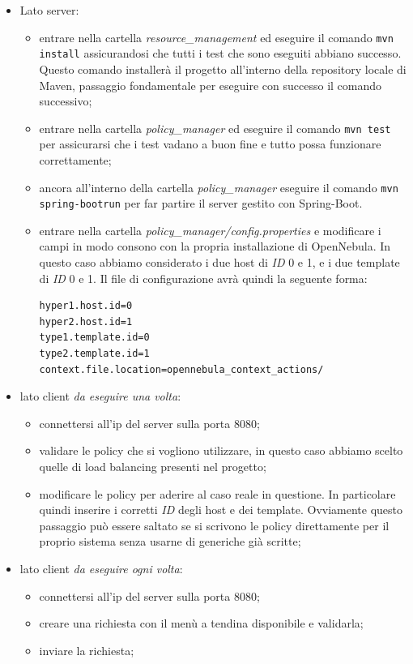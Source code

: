 \begin{itemize}
    \item Lato server:
\begin{itemize}
    \item entrare nella cartella \emph{resource\_management} ed eseguire il comando \texttt{mvn install} assicurandosi che tutti i test che sono eseguiti abbiano successo. Questo comando installerà il progetto all'interno della repository locale di Maven, passaggio fondamentale per eseguire con successo il comando successivo;
    \item entrare nella cartella \emph{policy\_manager} ed eseguire il comando \texttt{mvn test} per assicurarsi che i test vadano a buon fine e tutto possa funzionare correttamente;
    \item ancora all'interno della cartella \emph{policy\_manager} eseguire il comando \texttt{mvn spring-boot\:run} per far partire il server gestito con Spring-Boot.
    \item entrare nella cartella \emph{policy\_manager/config.properties} e modificare i campi in modo consono con la propria installazione di OpenNebula. In questo caso abbiamo considerato i due host di \emph{ID} 0 e 1, e i due template di \emph{ID} 0 e 1. Il file di configurazione avrà quindi la seguente forma:
    \begin{lstlisting}[xleftmargin=1em, label={code:config_properties}, caption={config.properties}]
hyper1.host.id=0
hyper2.host.id=1
type1.template.id=0
type2.template.id=1
context.file.location=opennebula_context_actions/
    \end{lstlisting}
\end{itemize}
    \item lato client \emph{da eseguire una volta}:
    \begin{itemize}
        \item connettersi all'ip del server sulla porta 8080;
        \item validare le policy che si vogliono utilizzare, in questo caso abbiamo scelto quelle di load balancing presenti nel progetto;
        \item modificare le policy per aderire al caso reale in questione. In particolare quindi inserire i corretti \emph{ID} degli host e dei template. Ovviamente questo passaggio può essere saltato se si scrivono le policy direttamente per il proprio sistema senza usarne di generiche già scritte;
    \end{itemize}
    \item lato client \emph{da eseguire ogni volta}:
    \begin{itemize}
        \item connettersi all'ip del server sulla porta 8080;
        \item creare una richiesta con il menù a tendina disponibile e validarla;
        \item inviare la richiesta;
    \end{itemize}
\end{itemize}
